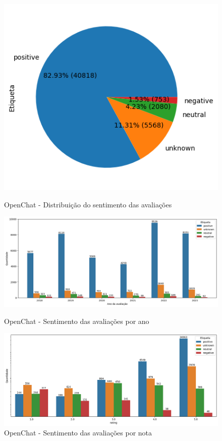 \begin{figure}
	\centering
	\begin{minipage}{0.8\textwidth}
		\centering
		\includegraphics[width=.6\textwidth]{figs/openchat/distribuicao_pizza.png}
		\caption{OpenChat - Distribuição do sentimento das avaliações}
		\label{img:openchat_pizza_distribuicao}
	\end{minipage}\hfill
	\begin{minipage}{1\textwidth}
		\centering
		\includegraphics[width=1\textwidth]{figs/openchat/sentimento_ano.png}
		\caption{OpenChat - Sentimento das avaliações por ano}
		\label{img:openchat_sentimento_ano}
	\end{minipage}\hfill
	\begin{minipage}{1\textwidth}
		\centering
		\includegraphics[width=1\textwidth]{figs/openchat/sentimento_nota.png}
		\caption{OpenChat - Sentimento das avaliações por nota}
		\label{img:openchat_sentimento_nota}
	\end{minipage}
\end{figure}

